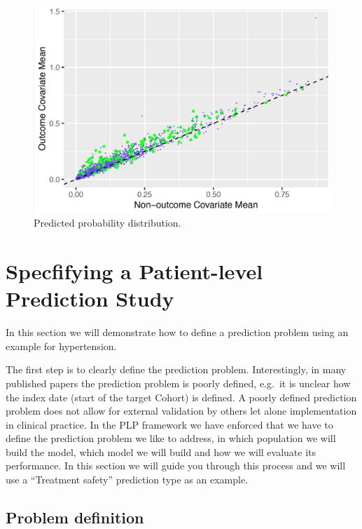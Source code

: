 \documentclass[11pt]{book}
\begin{document}
\begin{figure}

{\centering \includegraphics[width=1\linewidth]{images/PatientLevelPrediction/variableScatterplot} 

}

\caption{Predicted probability distribution.}\label{fig:plpVarScatter}
\end{figure}

\newpage 

\section{Specfifying a Patient-level Prediction
Study}\label{specfifying-a-patient-level-prediction-study}

In this section we will demonstrate how to define a prediction problem
using an example for hypertension.

The first step is to clearly define the prediction problem.
Interestingly, in many published papers the prediction problem is poorly
defined, e.g.~it is unclear how the index date (start of the target
Cohort) is defined. A poorly defined prediction problem does not allow
for external validation by others let alone implementation in clinical
practice. In the PLP framework we have enforced that we have to define
the prediction problem we like to address, in which population we will
build the model, which model we will build and how we will evaluate its
performance. In this section we will guide you through this process and
we will use a ``Treatment safety'' prediction type as an example.

\subsection{Problem definition}\label{problem-definition-2}
\end{document}
